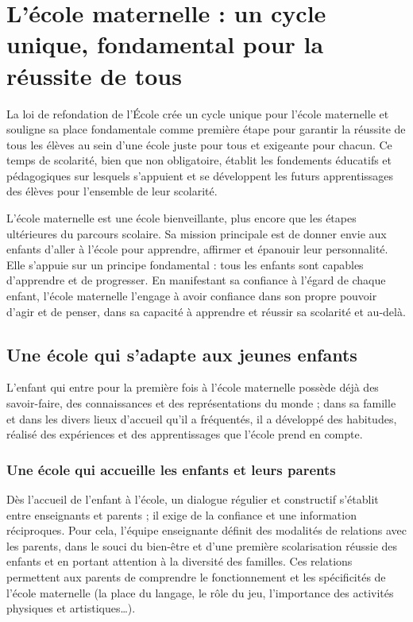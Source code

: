 \part{L’école maternelle : un cycle unique, fondamental pour la réussite de tous}
La loi de refondation de l’École crée un cycle unique pour l’école maternelle et souligne sa place fondamentale comme première étape pour garantir la réussite de tous les élèves au sein d’une école juste pour tous et exigeante pour chacun. Ce temps de scolarité, bien que non obligatoire, établit les fondements éducatifs et pédagogiques sur lesquels s’appuient et se développent les futurs apprentissages des élèves pour l’ensemble de leur scolarité. 

L’école maternelle est une école bienveillante, plus encore que les étapes ultérieures du parcours scolaire. Sa mission principale est de donner envie aux enfants d’aller à l’école pour apprendre, affirmer et épanouir leur personnalité. Elle s’appuie sur un principe fondamental : tous les enfants sont capables d'apprendre et de progresser. En manifestant sa confiance à l’égard de chaque enfant, l’école maternelle l’engage à avoir confiance dans son propre pouvoir d’agir et de penser, dans sa capacité à apprendre et réussir sa scolarité et au-delà.

\chapter{Une école qui s’adapte aux jeunes enfants}
L’enfant qui entre pour la première fois à l’école maternelle possède déjà des savoir-faire, des connaissances et des représentations du monde ; dans sa famille et dans les divers lieux d’accueil qu’il a fréquentés, il a développé des habitudes, réalisé des expériences et des apprentissages que l’école prend en compte.

\section{Une école qui accueille les enfants et leurs parents}
Dès l’accueil de l’enfant à l’école, un dialogue régulier et constructif s’établit entre enseignants et parents ; il exige de la confiance et une information réciproques. Pour cela, l’équipe enseignante définit des modalités de relations avec les parents, dans le souci du bien-être et d’une première scolarisation réussie des enfants et en portant attention à la diversité des familles. Ces relations permettent aux parents de comprendre le fonctionnement et les spécificités de l’école maternelle (la place du langage, le rôle du jeu, l’importance des activités physiques et artistiques\dots). 

